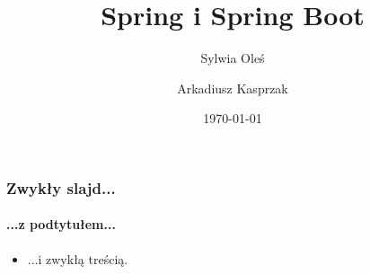 \documentclass{beamer}
\title{Spring i Spring Boot}
\subtitle{}
\author{Sylwia Oleś \and Arkadiusz Kasprzak}
\institute{}
\date{\today}
\begin{document}
\titleframe[pl]

\begin{frame}\frametitle{Zwykły slajd...}\framesubtitle{...z podtytułem...}
    \begin{itemize}[<+-|alert@+>]
        \item ...i zwykłą treścią.
    \end{itemize}
\end{frame}
\end{document}
